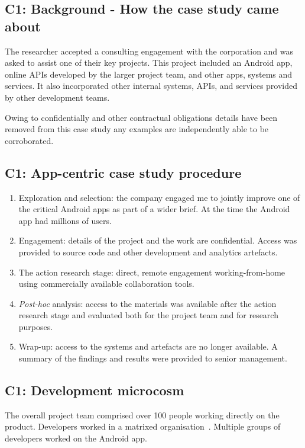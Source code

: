 \subsection{C1: Background - How the case study came about}
The researcher accepted a consulting engagement with the corporation and was asked to assist one of their key projects. This project included an Android app, online APIs developed by the larger project team, and other apps, systems and services. It also incorporated other internal systems, APIs, and services provided by other development teams. 

Owing to confidentially and other contractual obligations details have been removed from this case study any examples are independently able to be corroborated. 


\subsection{C1: App-centric case study procedure}
{\small
\begin{enumerate}
    \itemsep0em
    \item Exploration and selection: the company engaged me to jointly improve one of the critical Android apps as part of a wider brief. At the time the Android app had millions of users.
    \item Engagement: details of the project and the work are confidential. Access was provided to source code and other development and analytics artefacts.
    \item The action research stage: direct, remote engagement working-from-home using commercially available collaboration tools.
    \item \textit{Post-hoc} analysis: access to the materials was available after the action research stage and evaluated both for the project team and for research purposes.
    \item Wrap-up: access to the systems and artefacts are no longer available. A summary of the findings and results were provided to senior management.
\end{enumerate}
}


\subsection{C1: Development microcosm}
The overall project team comprised over 100 people working directly on the product. Developers worked in a matrixed organisation~. Multiple groups of developers worked on the Android app. 


